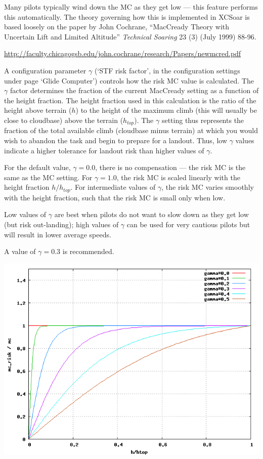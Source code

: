   Many pilots typically wind down the MC as they get low --- this
  feature performs this automatically.  The theory governing how this
  is implemented in XCSoar is based loosely on the paper by John
  Cochrane, ``MacCready Theory with Uncertain Lift and Limited
  Altitude'' {\em Technical Soaring} 23 (3) (July 1999) 88-96.

\url{http://faculty.chicagogsb.edu/john.cochrane/research/Papers/newmcred.pdf}

  A configuration parameter $\gamma$ (`STF risk factor', in the
  configuration settings under page `Glide Computer') controls how the
  risk MC value is calculated.  The $\gamma$ factor determines the
  fraction of the current MacCready setting as a function of the
  height fraction.  The height fraction used in this calculation is
  the ratio of the height above terrain ($h$) to the height of the
  maximum climb (this will usually be close to cloudbase) above the
  terrain ($h_{top}$).  The $\gamma$ setting thus represents the
  fraction of the total available climb (cloudbase minus terrain) at
  which you would wish to abandon the task and begin to prepare for a
  landout.  Thus, low $\gamma$ values indicate a higher tolerance for
  landout risk than higher values of $\gamma$.

  For the default value, $\gamma=0.0$, there is no compensation ---
  the risk MC is the same as the MC setting.  For $\gamma=1.0$, the
  risk MC is scaled linearly with the height fraction $h/h_{top}$.
  For intermediate values of $\gamma$, the risk MC varies smoothly
  with the height fraction, such that the risk MC is small only when
  low.

  Low values of $\gamma$ are best when pilots do not want to slow down
  as they get low (but risk out-landing); high values of $\gamma$ can
  be used for very cautious pilots but will result in lower average
  speeds.

  A value of $\gamma=0.3$ is recommended.

\begin{center}
\includegraphics[angle=0,width=\linewidth,keepaspectratio='true']{figures/riskmc.png}
\end{center}

